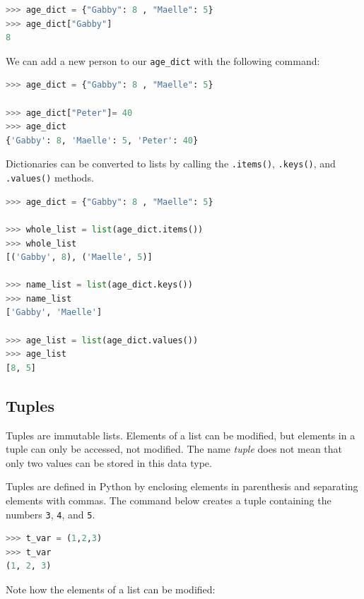 \documentclass{book}
\begin{document}
\begin{lstlisting}[language=Python]
>>> age_dict = {"Gabby": 8 , "Maelle": 5}
>>> age_dict["Gabby"]
8
\end{lstlisting}

We can add a new person to our \lstinline!age_dict! with the following
command:

\begin{lstlisting}[language=Python]
>>> age_dict = {"Gabby": 8 , "Maelle": 5}

>>> age_dict["Peter"]= 40
>>> age_dict
{'Gabby': 8, 'Maelle': 5, 'Peter': 40}
\end{lstlisting}

Dictionaries can be converted to lists by calling the
\lstinline!.items()!, \lstinline!.keys()!, and \lstinline!.values()!
methods.

\begin{lstlisting}[language=Python]
>>> age_dict = {"Gabby": 8 , "Maelle": 5}

>>> whole_list = list(age_dict.items())
>>> whole_list
[('Gabby', 8), ('Maelle', 5)]

>>> name_list = list(age_dict.keys())
>>> name_list
['Gabby', 'Maelle']

>>> age_list = list(age_dict.values())
>>> age_list
[8, 5]
\end{lstlisting}
    




    
        \subsection{Tuples}\label{tuples}
    




    
        Tuples are immutable lists. Elements of a list can be modified, but
elements in a tuple can only be accessed, not modified. The name
\emph{tuple} does not mean that only two values can be stored in this
data type.

Tuples are defined in Python by enclosing elements in parenthesis and
separating elements with commas. The command below creates a tuple
containing the numbers \lstinline!3!, \lstinline!4!, and \lstinline!5!.

\begin{lstlisting}[language=Python]
>>> t_var = (1,2,3)
>>> t_var
(1, 2, 3)
\end{lstlisting}

Note how the elements of a list can be modified:
\end{document}

